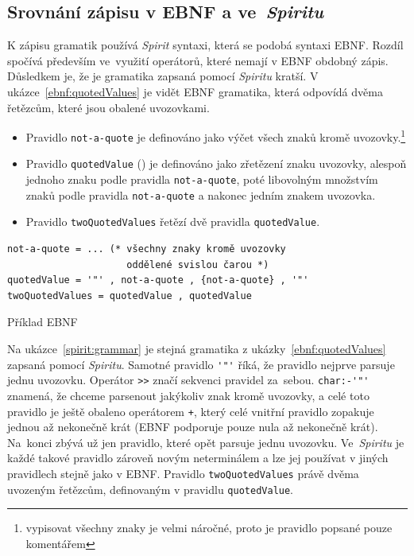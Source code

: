 \documentclass[thesis=B,czech,hidelinks]{FITthesis}[2019/03/06]
\begin{document}
\subsection{Srovnání zápisu v EBNF a ve~\textit{Spiritu}}
K zápisu gramatik používá \textit{Spirit} syntaxi, která se podobá syntaxi EBNF\@. Rozdíl spočívá především ve~využití operátorů, které nemají v EBNF obdobný zápis. Důsledkem je, že je gramatika zapsaná pomocí \textit{Spiritu} kratší. V ukázce~\ref{ebnf:quotedValues} je vidět EBNF gramatika, která odpovídá dvěma řetězcům, které jsou obalené uvozovkami.

\begin{itemize}
    \item Pravidlo \texttt{not-a-quote} je definováno jako výčet všech znaků kromě uvozovky.\footnote{vypisovat všechny znaky je velmi náročné, proto je pravidlo popsané pouze komentářem}
    \item Pravidlo \texttt{quotedValue} () je definováno jako zřetězení znaku uvozovky, alespoň jednoho znaku podle pravidla \texttt{not-a-quote}, poté libovolným množstvím znaků podle pravidla \texttt{not-a-quote} a nakonec jedním znakem uvozovka.
    \item Pravidlo \texttt{twoQuotedValues} řetězí dvě pravidla \texttt{quotedValue}.
\end{itemize}

\begin{listing}[H]
\begin{verbatim}
not-a-quote = ... (* všechny znaky kromě uvozovky
                     oddělené svislou čarou *)
quotedValue = '"' , not-a-quote , {not-a-quote} , '"'
twoQuotedValues = quotedValue , quotedValue
\end{verbatim}
\caption{Příklad EBNF}\label{ebnf:quotedValues}
\end{listing}

Na ukázce~\ref{spirit:grammar} je stejná gramatika z ukázky~\ref{ebnf:quotedValues} zapsaná pomocí \textit{Spiritu}. Samotné pravidlo \verb¨'"'¨ říká, že pravidlo nejprve parsuje jednu uvozovku. Operátor \verb¨>>¨ značí sekvenci pravidel za~sebou. \verb¨char:-'"'¨ znamená, že chceme parsenout jakýkoliv znak kromě uvozovky, a celé toto pravidlo je ještě obaleno operátorem \verb¨+¨, který celé vnitřní pravidlo zopakuje jednou až nekonečně krát (EBNF podporuje pouze nula až nekonečně krát). Na~konci zbývá už jen pravidlo, které opět parsuje jednu uvozovku. Ve~\textit{Spiritu} je každé takové pravidlo zároveň novým neterminálem a lze jej používat v jiných pravidlech stejně jako v EBNF\@. Pravidlo \texttt{twoQuotedValues} právě dvěma uvozeným řetězcům, definovaným v pravidlu \texttt{quotedValue}.
\end{document}
